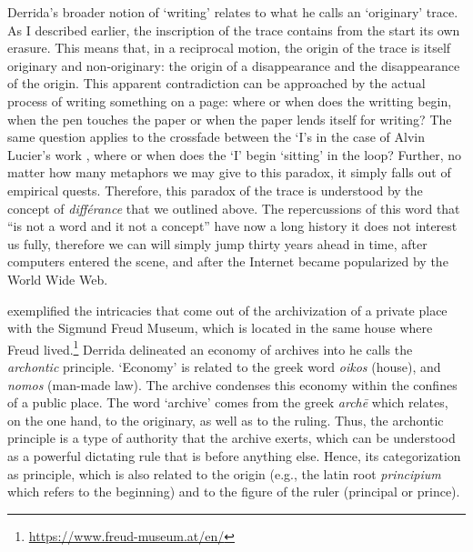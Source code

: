 Derrida's broader notion of `writing' relates to what he calls an `originary' trace. As I described earlier, the inscription of the trace contains from the start its own erasure. This means that, in a reciprocal motion, the origin of the trace is itself originary and non-originary: the origin of a disappearance and the disappearance of the origin. This apparent contradiction can be approached by the actual process of writing something on a page: where or when does the writting begin, when the pen touches the paper or when the paper lends itself for writing? The same question applies to the crossfade between the `I's in the case of Alvin Lucier's work , where or when does the `I' begin `sitting' in the loop? Further, no matter how many metaphors we may give to this paradox, it simply falls out of empirical quests. Therefore, this paradox of the trace is understood by the concept of \textit{différance} that we outlined above. The repercussions of this word that ``is not a word and it not a concept'' have now a long history it does not interest us fully, therefore we can will simply jump thirty years ahead in time, after computers entered the scene, and after the Internet became popularized by the World Wide Web.


\textcite{Der95:Arc} exemplified the intricacies that come out of the archivization of a private place with the Sigmund Freud Museum, which is located in the same house where Freud lived.\footnote{\url{https://www.freud-museum.at/en/}} Derrida delineated an economy of archives into he calls the \textit{archontic} principle. `Economy' is related to the greek word \textit{oikos} (house), and \textit{nomos} (man-made law). The archive condenses this economy within the confines of a public place. The word `archive' comes from the greek \textit{archē} which relates, on the one hand, to the originary, as well as to the ruling. Thus, the archontic principle is a type of authority that the archive exerts, which can be understood as a powerful dictating rule that is before anything else. Hence, its categorization as principle, which is also related to the origin (e.g., the latin root \textit{principium} which refers to the beginning) and to the figure of the ruler (principal or prince). 

